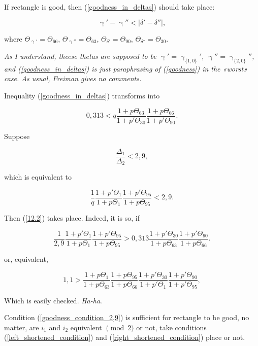 \documentclass[a4paper, 12pt]{article}
\let\oldref\ref
\renewcommand{\ref}[1]{(\oldref{#1})}
\theoremstyle{definition}
\theoremstyle{definition}
\theoremstyle{proposition}
\theoremstyle{lemma}
\newcommand{\g}{\upgamma}
\renewcommand{\d}{\delta}
\newcommand{\D}{\Delta}
\newcommand{\T}{\Theta}
\begin{document}
If rectangle is good, then \ref{goodness_in_deltas} should take place:

\begin{equation}\tag{12.1}\label{goodness_in_deltas}
	\g' - \g'' < |\d' - \d''|,
\end{equation}

where
$\T_{\g'} = \T_{66}$,
$\T_{\g''} = \T_{63}$,
$\T_{\d'} = \T_{90}$,
$\T_{\d''} = \T_{30}$.

{
	\itshape
	As I understand, theese thetas are supposed to be
	$\g' = \g_{\{1, 0\}}'$,
	$\g'' = \g_{\{2, 0\}}''$,
	and \ref{goodness_in_deltas} is just paraphrasing of \ref{goodness}
	in the «worst» case.
	As usual, Freiman gives no comments.
}

Inequality \ref{goodness_in_deltas} transforms into

\begin{equation}\tag{12.2}\label{12.2}
	0,313 <
	q
	\dfrac{1 + p \T_{63}}{1 + p' \T_{30}}
	\dfrac{1 + p \T_{66}}{1 + p' \T_{90}}.
\end{equation}

Suppose

\begin{equation}\tag{12.3}\label{goodness_condition_2,9}
	\dfrac{\D_1}{\D_2} < 2,9,
\end{equation}

which is equivalent to

\begin{equation}\tag{12.4}
	\dfrac{1}{q}
	\dfrac{1 + p' \T_{1}}{1 + p \T_{1}}
	\dfrac{1 + p' \T_{95}}{1 + p \T_{95}}
	<
	2,9.
\end{equation}

Then \ref{12.2} takes place. Indeed, it is so, if

\begin{equation*}
	\dfrac{1}{2,9}
	\dfrac{1 + p' \T_{1}}{1 + p \T_{1}}
	\dfrac{1 + p' \T_{95}}{1 + p \T_{95}}
	>
	0,313
	\dfrac{1 + p' \T_{30}}{1 + p \T_{63}}
	\dfrac{1 + p' \T_{90}}{1 + p \T_{66}}.
\end{equation*}

or, equivalent,

\begin{equation*}
	1,1
	>
	\dfrac{1 + p \T_{1}}{1 + p \T_{63}}
	\dfrac{1 + p \T_{95}}{1 + p \T_{66}}
	\dfrac{1 + p' \T_{30}}{1 + p' \T_{1}}
	\dfrac{1 + p' \T_{90}}{1 + p' \T_{95}},
\end{equation*}

Which is easily checked. \textit{Ha-ha}.

Condition \ref{goodness_condition_2,9} is sufficient for rectangle to be good,
no matter, are $i_1$ and $i_2$ equivalent $\pmod 2$ or not, take conditions
\ref{left_shortened_condition} and \ref{right_shortened_condition} place or not.
\end{document}
